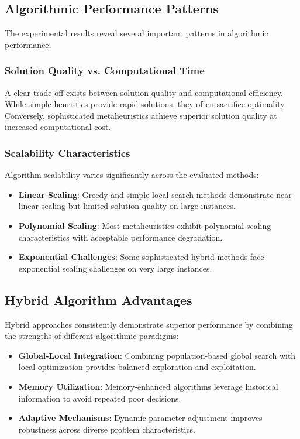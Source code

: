 \documentclass[11pt,a4paper]{article}
\begin{document}
\subsection{Algorithmic Performance Patterns}

The experimental results reveal several important patterns in algorithmic performance:

\subsubsection{Solution Quality vs. Computational Time}

A clear trade-off exists between solution quality and computational efficiency. While simple heuristics provide rapid solutions, they often sacrifice optimality. Conversely, sophisticated metaheuristics achieve superior solution quality at increased computational cost.

\subsubsection{Scalability Characteristics}

Algorithm scalability varies significantly across the evaluated methods:

\begin{itemize}
    \item \textbf{Linear Scaling}: Greedy and simple local search methods demonstrate near-linear scaling but limited solution quality on large instances.
    \item \textbf{Polynomial Scaling}: Most metaheuristics exhibit polynomial scaling characteristics with acceptable performance degradation.
    \item \textbf{Exponential Challenges}: Some sophisticated hybrid methods face exponential scaling challenges on very large instances.
\end{itemize}

\subsection{Hybrid Algorithm Advantages}

Hybrid approaches consistently demonstrate superior performance by combining the strengths of different algorithmic paradigms:

\begin{itemize}
    \item \textbf{Global-Local Integration}: Combining population-based global search with local optimization provides balanced exploration and exploitation.
    \item \textbf{Memory Utilization}: Memory-enhanced algorithms leverage historical information to avoid repeated poor decisions.
    \item \textbf{Adaptive Mechanisms}: Dynamic parameter adjustment improves robustness across diverse problem characteristics.
\end{itemize}
\end{document}
